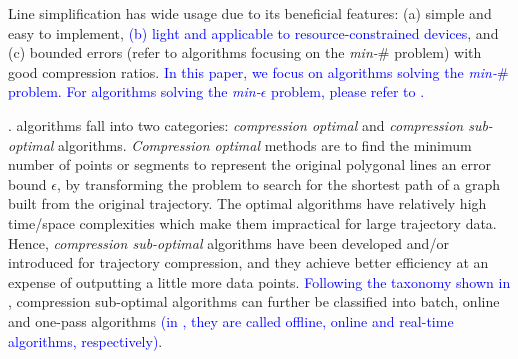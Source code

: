 %
Line simplification has wide usage due to its beneficial features: (a) simple and easy to implement, \textcolor{blue}{(b) light and applicable to resource-constrained devices}, and (c) bounded errors (refer to algorithms focusing on the \emph{min-$\#$} problem) with good compression ratios. 
%
\textcolor{blue}{In this paper, we focus on \lsa algorithms solving the \emph{min-$\#$} problem. For algorithms solving the \emph{min-$\epsilon$} problem, please refer to \cite{Muckell:SQUISH,Muckell:Compression,Zhang:Evaluation}.}
%
%


. \lsa algorithms fall into two categories: \textit{compression optimal} and \textit{compression sub-optimal} algorithms.
\textit{Compression optimal} methods \cite{Imai:Optimal,Chan:Optimal} are to find the minimum number of points or segments to represent the original polygonal lines \wrt an error bound $\epsilon$, by transforming the problem to search for the shortest path of a graph built from the original trajectory.
The optimal \lsa algorithms have relatively high time/space complexities which make them impractical for large trajectory data.
Hence, \textit{compression sub-optimal} algorithms have been developed and/or introduced for trajectory compression, and they achieve better efficiency at an expense of outputting a little more data points. \textcolor{blue}{Following the taxonomy shown in \cite{Lange:Tracking, Lin:Operb, Lin:Cised}}, compression sub-optimal algorithms can further be classified into batch, online and one-pass algorithms \textcolor{blue}{(in \cite{Lange:Tracking}, they are called offline, online and real-time algorithms, respectively)}.

